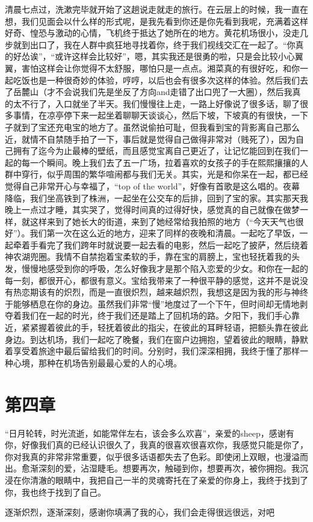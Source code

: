 \documentclass{article}
\begin{document}
清晨七点过，洗漱完毕就开始了这趟说走就走的旅行。在云层上的时候，我一直在想，我们见面会以什么样的形式呢，是我先看到你还是你先看到我呢，充满着这样好奇、惶恐与激动的心情，飞机终于抵达了她所在的地方。黄花机场很小，没走几步就到出口了，我在人群中疯狂地寻找着你，终于我们视线交汇在一起了。“你真的好怂诶”，“或许这样会比较好”，嗯，其实我还是很勇的啦，只是会比较小心翼翼，害怕这样会让你觉得不太舒服，哪怕只是一点点。湘菜真的有很好吃，和你一起吃饭也是一种很奇妙的体验，哼哼，以后也会有很多次这样的体验。然后我们去了岳麓山（才不会说我们先是坐反了方向and走错了出口兜了一大圈），然后我真的太不行了，入口就坐了半天。我们慢慢往上走，一路上好像说了很多话，聊了很多事情，在凉亭停下来一起坐着聊聊天谈谈心，然后下坡，下坡真的有很快，一下子就到了宝还充电宝的地方了。虽然说偷拍可耻，但我看到宝的背影离自己那么近，就情不自禁随手拍了一下，事后就是觉得自己做得非常对（贱死了），因为自己拥有了迄今为止最棒的壁纸，而且感觉宝离自己更近了，让记忆能回到在我们一起的每一个瞬间。晚上我们去了五一广场，拉着喜欢的女孩子的手在熙熙攘攘的人群中穿行，似乎周围的繁华喧闹都与我们无关。其实，光是和你呆在一起，都已经觉得自己非常开心与幸福了，“top of the world”，好像有首歌是这么唱的。夜幕降临，我们坐高铁到了株洲，一起坐在公交车的后排，回到了宝的家。其实那天我晚上一点过才睡，其实哭了，觉得时间真的过得好快，感觉真的自己就像在做梦一样，就这样来到了她长大的街道，来到了她经常给我拍照的地方（“今天天气也很好”）。我们第一次在这么近的地方，迎来了同样的夜晚和清晨。一起吃了早饭，一起牵着手看完了我们跨年时就说要一起去看的电影，然后一起吃了披萨，然后绕着神农湖兜圈。我情不自禁抱着宝柔软的手，靠在宝的肩膀上，宝也轻抚着我的头发，慢慢地感受到你的呼吸，怎么好像我才是那个陷入恋爱的少女。和你在一起的每一刻，都很开心，都很有意义。宝给我带来了一种很平静的感觉，这并不是说没有热恋期该有的炽烈，而是一直很炽烈，越来越炽烈，我想这是因为我的形与神终于能够栖息在你的身边。虽然我们非常“慢”地度过了一个下午，但时间却无情地剥夺着我们在一起的时光，终于我们还是踏上了回机场的路。夕阳下，我们手心靠近，紧紧握着彼此的手，轻抚着彼此的指尖，在彼此的耳畔轻语，把额头靠在彼此身边。到达机场，我们一起吃了晚餐，我们在窗户边拥抱，望着彼此的眼睛，静默着享受着旅途中最后留给我们的时间。分别时，我们深深相拥，我终于懂了那样一种心境，那种在机场告别最最心爱的人的心境。



{\centering\section*{第四章}}



“日月轮转，时光流逝，如能常伴左右，该会多么欢喜”，亲爱的sheep，感谢有你，好像我们真的已经认识很久了，我真的很喜欢很喜欢你，我感觉只能是你了，你对我真的非常非常重要，似乎很多话语都失去了色彩。即使闭上双眼，也漫溢而出。愈渐深刻的爱，沾湿睫毛。想要再次，触碰到你，想要再次，被你拥抱。我沉浸在你清澈的眼睛中，我把自己一半的灵魂寄托在了亲爱的你身上，我终于找到了你，我也终于找到了自己。

逐渐炽烈，逐渐深刻，感谢你填满了我的心，我们会走得很远很远，对吧
\end{document}
